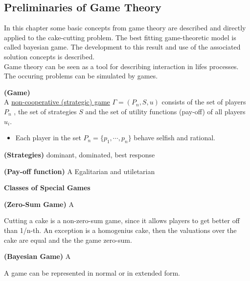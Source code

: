 \subsection{Preliminaries of Game Theory}
In this chapter some basic concepts from game theory are described and directly applied to the cake-cutting problem. The best fitting game-theoretic model is called bayesian game. The development to this result and use of the associated solution concepts is described.\\
Game theory can be seen as a tool for describing interaction in lifes processes. The occuring problems can be simulated by games.  
\begin{defi}{\textbf{(Game)}}\\
A \underline{non-cooperative (strategic) game} $\Gamma=(P_n,S,u)$ consists of the set of players $P_n$ , the set of strategies $S$ and the set of utility functions (pay-off) of all players $u_i$.
\begin{itemize}
\item Each player in the set $P_n=\{p_1,\cdots,p_n\}$ behave selfish and rational.
\end{itemize}
\end{defi}

\begin{defi}{\textbf{(Strategies)}}
dominant, dominated, best response
\end{defi}
\begin{defi}{\textbf{(Pay-off function)}}
A Egalitarian and utiletarian
\end{defi}
\textbf{Classes of Special Games}\\
\begin{defi}{\textbf{(Zero-Sum Game)}}
A 
\end{defi}
Cutting a cake is a non-zero-sum game, since it allows players to get better off than 1/n-th. An exception is a homogenius cake, then the valuations over the cake are equal and the the game zero-sum.\\
\newline
\begin{defi}{\textbf{(Bayesian Game)}}
A 
\end{defi}
A game can be represented in normal or in extended form.
 
